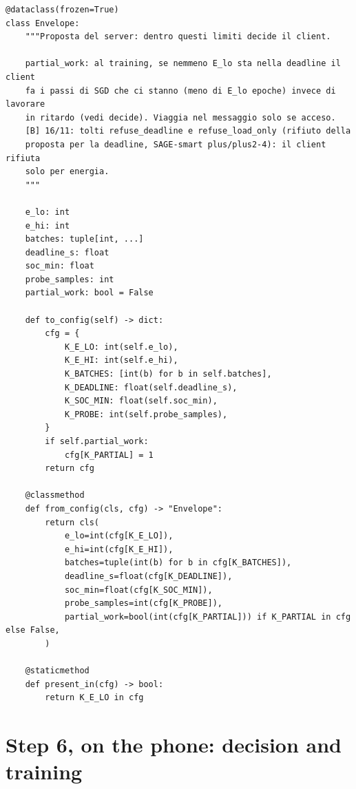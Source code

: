 \documentclass[11pt,a4paper]{article}
\begin{document}
\begin{lstlisting}[style=py,firstnumber=64,caption={\texttt{tesifl/tesiFL/client\_policy.py}, lines 64--111}]
@dataclass(frozen=True)
class Envelope:
    """Proposta del server: dentro questi limiti decide il client.

    partial_work: al training, se nemmeno E_lo sta nella deadline il client
    fa i passi di SGD che ci stanno (meno di E_lo epoche) invece di lavorare
    in ritardo (vedi decide). Viaggia nel messaggio solo se acceso.
    [B] 16/11: tolti refuse_deadline e refuse_load_only (rifiuto della
    proposta per la deadline, SAGE-smart plus/plus2-4): il client rifiuta
    solo per energia.
    """

    e_lo: int
    e_hi: int
    batches: tuple[int, ...]
    deadline_s: float
    soc_min: float
    probe_samples: int
    partial_work: bool = False

    def to_config(self) -> dict:
        cfg = {
            K_E_LO: int(self.e_lo),
            K_E_HI: int(self.e_hi),
            K_BATCHES: [int(b) for b in self.batches],
            K_DEADLINE: float(self.deadline_s),
            K_SOC_MIN: float(self.soc_min),
            K_PROBE: int(self.probe_samples),
        }
        if self.partial_work:
            cfg[K_PARTIAL] = 1
        return cfg

    @classmethod
    def from_config(cls, cfg) -> "Envelope":
        return cls(
            e_lo=int(cfg[K_E_LO]),
            e_hi=int(cfg[K_E_HI]),
            batches=tuple(int(b) for b in cfg[K_BATCHES]),
            deadline_s=float(cfg[K_DEADLINE]),
            soc_min=float(cfg[K_SOC_MIN]),
            probe_samples=int(cfg[K_PROBE]),
            partial_work=bool(int(cfg[K_PARTIAL])) if K_PARTIAL in cfg else False,
        )

    @staticmethod
    def present_in(cfg) -> bool:
        return K_E_LO in cfg
\end{lstlisting}

\newpage
\section{Step 6, on the phone: decision and training}
\label{sec:client}
\end{document}
